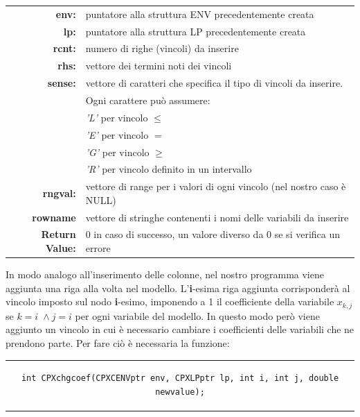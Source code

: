 \begin{table}[h]
\centering
\begin{tabular}{rl}
\textbf{env:} & {puntatore alla struttura ENV precedentemente creata}\\
\textbf{lp:} & {puntatore alla struttura LP precedentemente creata}\\
\textbf{rcnt:} & {numero di righe (vincoli) da inserire}\\
\textbf{rhs:} & {vettore dei termini noti dei vincoli}\\
\textbf{sense:} & {vettore di caratteri che specifica il tipo di vincoli da inserire.}\\
&{Ogni carattere può assumere:}\\
&{\textit{'L'} per vincolo $\leq$}\\
&{\textit{'E'} per vincolo $=$}\\
&{\textit{'G'} per vincolo $\geq$}\\
&{\textit{'R'} per vincolo definito in un intervallo}\\
\textbf{rngval:} & {vettore di range per i valori di ogni vincolo (nel nostro caso è NULL)}\\
\textbf{rowname} & {vettore di stringhe contenenti i nomi delle variabili da inserire}\\
\textbf{Return Value:} & {0 in caso di successo, un valore diverso da 0 se si verifica un errore}\\
\end{tabular}
\end{table}
In modo analogo all'inserimento delle colonne, nel nostro programma viene aggiunta una riga alla volta nel modello. L'\textbf{i}-esima riga aggiunta corrisponderà al vincolo imposto sul nodo \textbf{i}-esimo, imponendo a 1 il coefficiente della variabile $x_{k,j}$ se $k=i \;\wedge j=i$ per ogni variabile del modello. In questo modo però viene aggiunto un vincolo in cui è necessario cambiare i coefficienti delle variabili che ne prendono parte. Per fare ciò è necessaria la funzione:
\begin{center}
\begin{tabular}{c}
\begin{lstlisting}[linewidth=380pt, basicstyle=\footnotesize\sffamily,]   
int CPXchgcoef(CPXCENVptr env, CPXLPptr lp, int i, int j, double newvalue);
\end{lstlisting}
\end{tabular}
\end{center}

